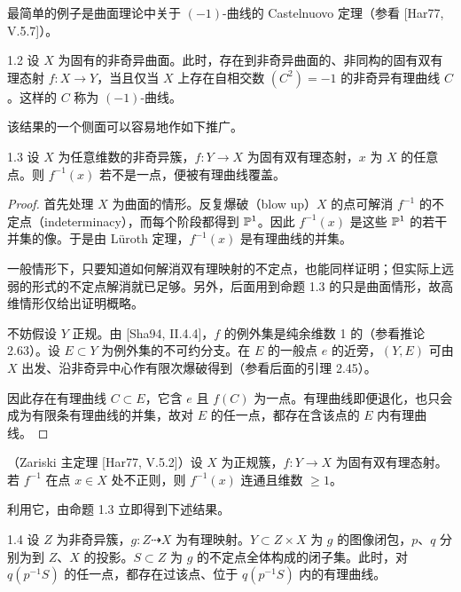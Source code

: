 最简单的例子是曲面理论中关于 $(-1)$-曲线的 Castelnuovo 定理（参看 [Har77, V.5.7]）。

\begin{theorem}{1.2}
设 $X$ 为固有的非奇异曲面。此时，存在到非奇异曲面的、非同构的固有双有理态射 $f:X\to Y$，当且仅当 $X$ 上存在自相交数 $(C^2)=-1$ 的非奇异有理曲线 $C$。这样的 $C$ 称为 $(-1)$-曲线。
\end{theorem}

该结果的一个侧面可以容易地作如下推广。

\begin{propositionp}{1.3}
设 $X$ 为任意维数的非奇异簇，$f:Y\to X$ 为固有双有理态射，$x$ 为 $X$ 的任意点。则 $f^{-1}(x)$ 若不是一点，便被有理曲线覆盖。
\end{propositionp}

\begin{proof}
首先处理 $X$ 为曲面的情形。反复爆破（blow up）$X$ 的点可解消 $f^{-1}$ 的不定点（indeterminacy），而每个阶段都得到 $\mathbb{P}^1$。因此 $f^{-1}(x)$ 是这些 $\mathbb{P}^1$ 的若干并集的像。于是由 Lüroth 定理，$f^{-1}(x)$ 是有理曲线的并集。

一般情形下，只要知道如何解消双有理映射的不定点，也能同样证明；但实际上远弱的形式的不定点解消就已足够。另外，后面用到命题 1.3 的只是曲面情形，故高维情形仅给出证明概略。

不妨假设 $Y$ 正规。由 [Sha94, II.4.4]，$f$ 的例外集是纯余维数 1 的（参看推论 2.63）。设 $E\subset Y$ 为例外集的不可约分支。在 $E$ 的一般点 $e$ 的近旁，$(Y,E)$ 可由 $X$ 出发、沿非奇异中心作有限次爆破得到（参看后面的引理 2.45）。

因此存在有理曲线 $C\subset E$，它含 $e$ 且 $f(C)$ 为一点。有理曲线即便退化，也只会成为有限条有理曲线的并集，故对 $E$ 的任一点，都存在含该点的 $E$ 内有理曲线。
\end{proof}


（Zariski 主定理 [Har77, V.5.2]）设 $X$ 为正规簇，$f:Y\to X$ 为固有双有理态射。若 $f^{-1}$ 在点 $x\in X$ 处不正则，则 $f^{-1}(x)$ 连通且维数 $\ge 1$。

利用它，由命题 1.3 立即得到下述结果。

\begin{corollary}{1.4}
设 $Z$ 为非奇异簇，$g: Z\dashrightarrow X$ 为有理映射。$Y\subset Z\times X$ 为 $g$ 的图像闭包，$p$、$q$ 分别为到 $Z$、$X$ 的投影。$S\subset Z$ 为 $g$ 的不定点全体构成的闭子集。此时，对 $q(p^{-1}S)$ 的任一点，都存在过该点、位于 $q(p^{-1}S)$ 内的有理曲线。
\end{corollary}

